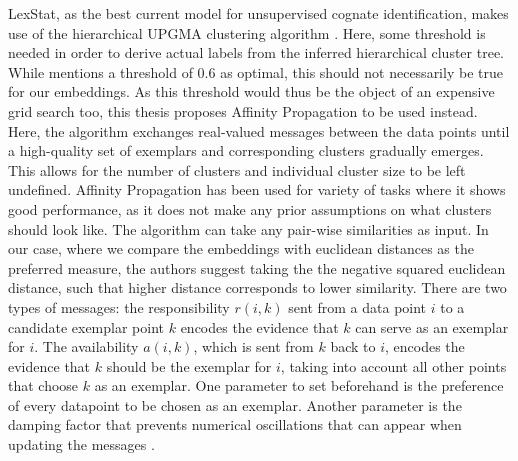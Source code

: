 \documentclass[6pt]{article}
\begin{document}
LexStat, as the best current model for unsupervised cognate identification, makes use of the hierarchical UPGMA clustering algorithm \citep{sokal1958statistical}. Here, some threshold is needed in order to derive actual labels from the inferred hierarchical cluster tree. While \cite{list2012lexstat} mentions a threshold of 0.6 as optimal, this should not necessarily be true for our embeddings. As this threshold would thus be the object of an expensive grid search too, this thesis proposes Affinity Propagation \citep{frey2007clustering} to be used instead. Here, the algorithm exchanges real-valued messages between the data points until a high-quality set of exemplars and corresponding clusters gradually emerges. This allows for the number of clusters and individual cluster size to be left undefined. Affinity Propagation has been used for variety of tasks where it shows good performance, as it does not make any prior assumptions on what clusters should look like. The algorithm can take any pair-wise similarities as input. In our case, where we compare the embeddings with euclidean distances as the preferred measure, the authors suggest taking the the negative squared euclidean distance, such that higher distance corresponds to  lower similarity. There are two types of messages: the responsibility $r(i,k)$ sent from a data point $i$ to a candidate exemplar point $k$ encodes the evidence that $k$ can serve as an exemplar for $i$. The availability $a(i,k)$, which is sent from $k$ back to $i$, encodes the evidence that $k$ should be the exemplar for $i$, taking into account all other points that choose $k$ as an exemplar. One parameter to set beforehand is the preference of every datapoint to be chosen as an exemplar. Another parameter is the damping factor that prevents numerical oscillations that can appear when updating the messages \citep[p. 972]{frey2007clustering}.
\end{document}
